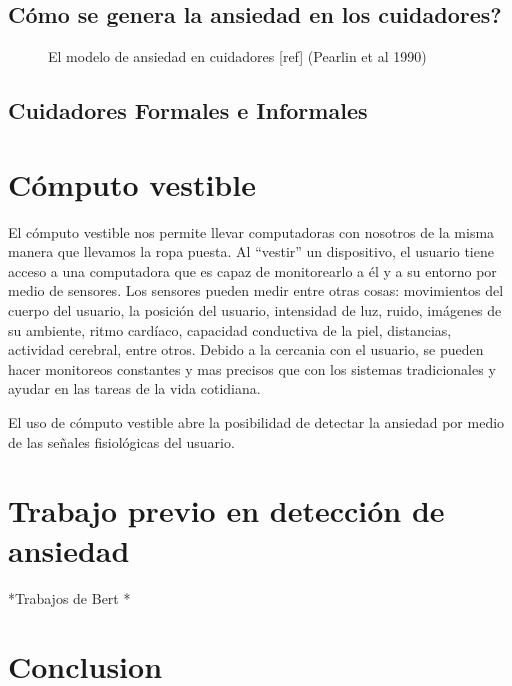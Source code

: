 \subsection{C\'omo se genera la ansiedad en los cuidadores?}\label{secc:caregiverburden}

\begin{figure}[h]
	\centering
	\caption{El modelo de ansiedad en cuidadores [ref] (Pearlin et al 1990)} \label{fig:instauracionFatigaReposo}
\end{figure}

\subsection{Cuidadores Formales e Informales}\label{secc:caregivers}
\section{C\'omputo vestible}\label{secc:dementia}
El c\'omputo vestible nos permite llevar computadoras con nosotros de la misma manera que llevamos la ropa puesta. Al ``vestir'' un dispositivo, el usuario tiene acceso a una computadora que es capaz de monitorearlo a \'el y a su entorno por medio de sensores. Los sensores pueden medir entre otras cosas: movimientos del cuerpo del usuario, la posici\'on del usuario, intensidad de luz, ruido, im\'agenes de su ambiente, ritmo card\'iaco, capacidad conductiva de la piel, distancias, actividad cerebral, entre otros. Debido a la cercania con el usuario, se pueden hacer monitoreos constantes y mas precisos que con los sistemas tradicionales y ayudar en las tareas de la vida cotidiana.

El uso de c\'omputo vestible abre la posibilidad de detectar la ansiedad por medio de las se\~nales fisiol\'ogicas del usuario.

\section{Trabajo previo en detecci\'on de ansiedad}

*Trabajos de Bert
*
\section{Conclusion}\label{secc:conclution}



\newpage
